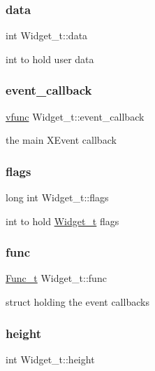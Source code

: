 \subsubsection{\texorpdfstring{data}{data}}
{\footnotesize\ttfamily int Widget\+\_\+t\+::data}

int to hold user data \mbox{\label{structWidget__t_af0adf855c1991d11f59c5b6f9a2c526a}} 
\subsubsection{\texorpdfstring{event\+\_\+callback}{event\_callback}}
{\footnotesize\ttfamily \hyperlink{xwidget_8h_a6423c133fb634585762a77dda34befab}{vfunc} Widget\+\_\+t\+::event\+\_\+callback}

the main X\+Event callback \mbox{\label{structWidget__t_ada1de5e6a955dc81fa956c9e7f2d2062}} 
\subsubsection{\texorpdfstring{flags}{flags}}
{\footnotesize\ttfamily long int Widget\+\_\+t\+::flags}

int to hold \hyperlink{structWidget__t}{Widget\+\_\+t} flags \mbox{\label{structWidget__t_a225b9a175e132994a5aa73b59a2911ad}} 
\subsubsection{\texorpdfstring{func}{func}}
{\footnotesize\ttfamily \hyperlink{structFunc__t}{Func\+\_\+t} Widget\+\_\+t\+::func}

struct holding the event callbacks \mbox{\label{structWidget__t_a1def6d2237743e75a0b84ca0c34a6834}} 
\subsubsection{\texorpdfstring{height}{height}}
{\footnotesize\ttfamily int Widget\+\_\+t\+::height}

